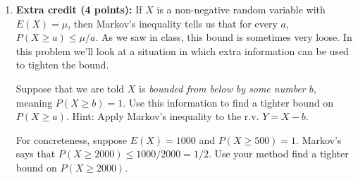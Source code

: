 \documentclass[11pt]{article}
\begin{document}
\begin{enumerate}
\item \textbf{Extra credit (4 points):} If $X$ is a non-negative
random variable with $E(X) = \mu$, then Markov's inequality tells us
that for every $a$, $P(X \geq a) \leq \mu/a$.  As we saw in class,
this bound is sometimes very loose.  In this problem we'll look at
a situation in which extra information can be used to tighten the
bound.

Suppose that we are told $X$ is \emph{bounded
from below by some number $b$}, meaning $P(X \geq b) = 1$.  Use this information
to find a tighter bound on $P(X \geq a)$.  \textsf{Hint:  Apply Markov's
inequality to the r.v.  $Y = X - b$.}

For concreteness, suppose $E(X) = 1000$ and $P(X \geq 500) = 1$.  Markov's
says that $P(X \geq 2000) \leq 1000/2000 = 1/2$.  Use your method find a
tighter bound on $P(X \geq 2000)$.

\end{enumerate}
\end{document}
